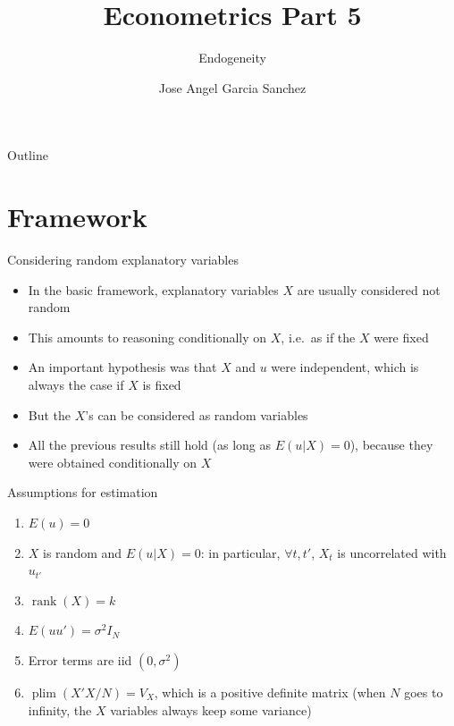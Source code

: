 \documentclass[aspectratio=169]{beamer}
\title{Econometrics Part 5}
\subtitle{Endogeneity}
\author{Jose Angel Garcia Sanchez}
\institute{Université Paris 1 Panthéon-Sorbonne}
\date{} %
\DeclareMathOperator{\plim}{plim}
\begin{document}
{
\begin{frame}
\titlepage
\end{frame}
}

\begin{frame}{Outline}
\tableofcontents
\end{frame}

\section{Framework}

\begin{frame}{Considering random explanatory variables}
\begin{itemize}
    \item In the basic framework, explanatory variables $X$ are usually considered not random
    \item This amounts to reasoning conditionally on $X$, i.e.\ as if the $X$ were fixed
    \item An important hypothesis was that $X$ and $u$ were independent, which is always the case if $X$ is fixed
    \item But the $X$'s can be considered as random variables
    \item All the previous results still hold (as long as $E(u|X) = 0$), because they were obtained conditionally on $X$
\end{itemize}
\end{frame}

\begin{frame}{Assumptions for estimation}
\begin{enumerate}
    \item $E(u) = 0$
    \item $X$ is random and $E(u|X) = 0$: in particular, $\forall t, t'$, $X_t$ is uncorrelated with $u_{t'}$
    \item $\operatorname{rank}(X) = k$
    \item $E(uu') = \sigma^2I_N$
    \item Error terms are iid $(0, \sigma^2)$
    \item $\plim(X'X/N) = V_X$, which is a positive definite matrix (when $N$ goes to infinity, the $X$ variables always keep some variance)
\end{enumerate}
\end{frame}
\end{document}
